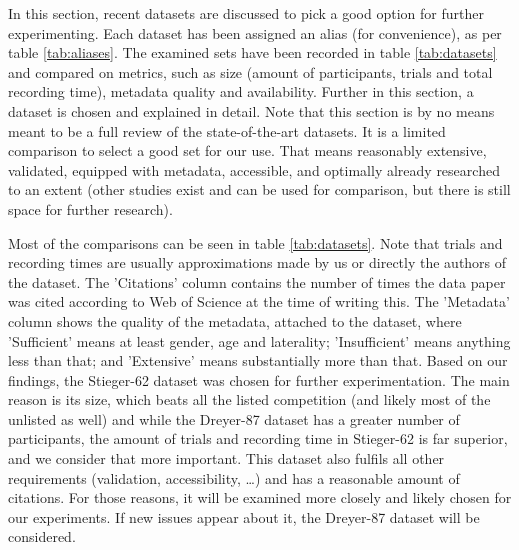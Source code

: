 \documentclass[english, he, bc, kiv, iso690alph, viewonly]{fasthesis}
\begin{document}
In this section, recent datasets are discussed to pick a good option for further experimenting. Each dataset has been assigned an alias (for convenience), as per table \ref{tab:aliases}. The examined sets have been recorded in table \ref{tab:datasets} and compared on metrics, such as size (amount of participants, trials and total recording time), metadata quality and availability. Further in this section, a dataset is chosen and explained in detail. Note that this section is by no means meant to be a full review of the state-of-the-art datasets. It is a limited comparison to select a good set for our use. That means reasonably extensive, validated, equipped with metadata, accessible, and optimally already researched to an extent (other studies exist and can be used for comparison, but there is still space for further research).

Most of the comparisons can be seen in table \ref{tab:datasets}. Note that trials and recording times are usually approximations made by us or directly the authors of the dataset. The 'Citations' column contains the number of times the data paper was cited according to Web of Science at the time of writing this. The 'Metadata' column shows the quality of the metadata, attached to the dataset, where 'Sufficient' means at least gender, age and laterality; 'Insufficient' means anything less than that; and 'Extensive' means substantially more than that.
Based on our findings, the Stieger-62 dataset was chosen for further experimentation. The main reason is its size, which beats all the listed competition (and likely most of the unlisted as well) and while the Dreyer-87 dataset has a greater number of participants, the amount of trials and recording time in Stieger-62 is far superior, and we consider that more important. This dataset also fulfils all other requirements (validation, accessibility, \dots) and has a reasonable amount of citations. For those reasons, it will be examined more closely and likely chosen for our experiments. If new issues appear about it, the Dreyer-87 dataset will be considered.
\end{document}
